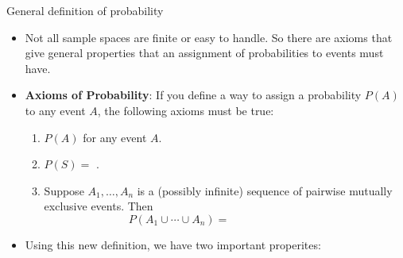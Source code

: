 \documentclass{article}
\newcommand{\blankul}[1]{\rule[-1.5mm]{#1}{0.15mm}}	%
\newcommand{\vecn}[2]{#1_1, \ldots, #1_{#2}}		%
\begin{document}
General definition of probability\bigskip
\begin{itemize}
    \item Not all sample spaces are finite or easy to handle. So there are axioms that give general properties that an assignment of probabilities to events must have.
    \item \textbf{Axioms of Probability}: If you define a way to assign a probability $P(A)$ to any event $A$, the following axioms must be true:\bigskip
    \begin{enumerate}
        \item $P(A)$ \hspace{20pt} for any event $A$.
        \item $P(S) = $ \hspace{10pt}.
        \item Suppose $\vecn{A}{n}$ is a (possibly infinite) sequence of pairwise mutually exclusive events. Then
        \[P(A_1 \cup \cdots \cup A_n) = \hspace{100pt}\]
    \end{enumerate}\bigskip
    \item Using this new definition, we have two important properites:\bigskip
\end{itemize}\bigskip
\end{document}

